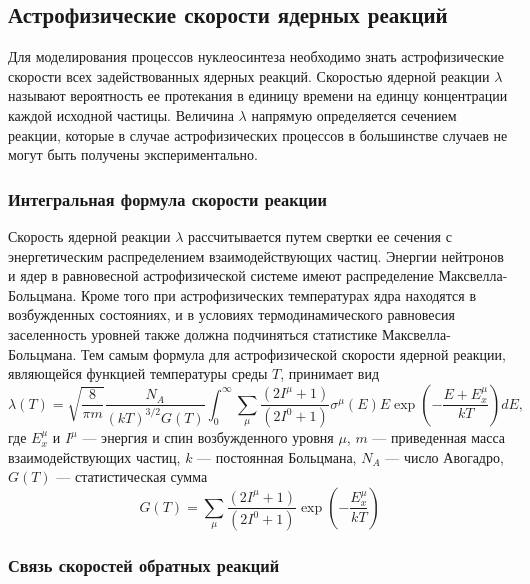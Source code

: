 \subsection{Астрофизические скорости ядерных реакций}

Для моделирования процессов нуклеосинтеза необходимо знать астрофизические скорости всех задействованных ядерных реакций. Скоростью ядерной реакции $\lambda$ называют вероятность ее протекания в единицу времени на единцу концентрации каждой исходной частицы. Величина $\lambda$ напрямую определяется сечением реакции, которые в случае астрофизических процессов в большинстве случаев не могут быть получены экспериментально.



\subsubsection{Интегральная формула скорости реакции}

Скорость ядерной реакции $\lambda$ рассчитывается путем свертки ее сечения с энергетическим распределением взаимодействующих частиц. Энергии нейтронов и ядер в равновесной астрофизической системе имеют распределение Максвелла-Больцмана. Кроме того при астрофизических температурах ядра находятся в возбужденных состояниях, и в условиях термодинамического равновесия заселенность уровней также должна подчиняться статистике Максвелла-Больцмана. Тем самым формула для астрофизической скорости ядерной реакции, являющейся функцией температуры среды $T$, принимает вид
\begin{equation}
\displaystyle
\lambda(T) = \sqrt{\frac{8}{\pi m}} \frac{N_A}{(k T)^{3/2} G(T)} \int_0^\infty \sum_\mu \frac{(2 I^\mu + 1)}{(2 I^0 + 1)} \sigma^\mu(E) E \exp \left( - \frac{E + E_x^\mu}{kT} \right) dE,
\label{eq:rate}
\end{equation}
где $E^\mu_x$ и $I^\mu$ --- энергия и спин возбужденного уровня $\mu$, $m$ --- приведенная масса взаимодействующих частиц, $k$ --- постоянная Больцмана, $N_A$ --- число Авогадро, $G(T)$ --- статистическая сумма
\begin{equation}
    \displaystyle
    G(T) = \sum_\mu \frac{(2 I^\mu + 1)}{(2 I^0 + 1)} \exp \left( - \frac{E_x^\mu}{kT} \right)
\end{equation}

\subsubsection{Связь скоростей обратных реакций}
